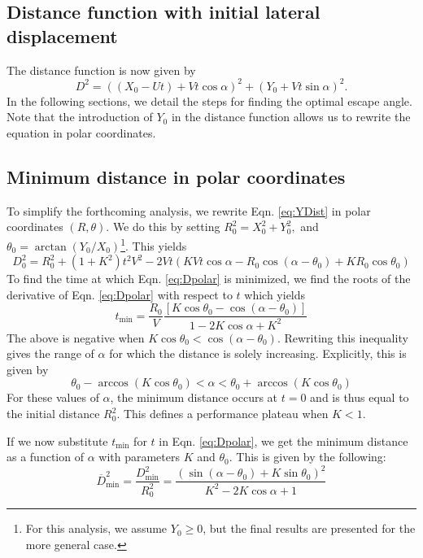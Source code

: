 \documentclass[12pt]{article}
\def\ds{\displaystyle}
\newcommand{\ol}{\overline}
\begin{document}
\subsection{Distance function with initial lateral displacement}
The distance function is now given by    
%
\begin{equation}
D^2 = ((X_0 - Ut) + Vt\cos\alpha)^2 + (Y_0 + Vt\sin\alpha)^2.
\label{eq:YDist}
\end{equation}
%
In the following sections, we detail the steps for finding the optimal escape angle. Note that the introduction of $Y_0$ in the distance function allows us to rewrite the equation in polar coordinates. 

\subsection{Minimum distance in polar coordinates}
To simplify the forthcoming analysis, we rewrite Eqn. \ref{eq:YDist} in polar coordinates $(R,\theta)$. We do this by setting $R_0^2 = X_0^2 + Y_0^2,$ and $\theta_0 = \arctan(Y_0/X_0)$\footnote{For this analysis, we assume $Y_0 \geq 0$, but the final results are presented for the more general case.}. This yields 
%
\begin{equation}
D_0^2 = R_0^2 + (1 + K^2) t^2 V^2 - 
 2 V t(K V t \cos \alpha  - R_0 \cos(\alpha - \theta_0) + K R_0 \cos \theta_0) 
 \label{eq:Dpolar}
\end{equation}
%
To find the time at which Eqn. \ref{eq:Dpolar} is minimized, we find the roots of the derivative of Eqn. \ref{eq:Dpolar} with respect to $t$ which yields
%
\begin{equation}
t_{\text{min}} = \ds \frac{R_0}{V} \frac{\left[K \cos \theta_0 - \cos(\alpha - \theta_0)\right ]}{1- 2K \cos \alpha + K^2}
\label{eq:tmin}
\end{equation}
%
The above is negative when $K \cos \theta_0 < \cos(\alpha - \theta_0).$ Rewriting this inequality gives the range of $\alpha$ for which the distance is solely increasing. Explicitly, this is given by  
%
\begin{equation}
\theta_0 - \arccos(K \cos \theta_0) < \alpha < \theta_0 + \arccos(K \cos \theta_0)
\label{eq:alphabound}
\end{equation}
%
For these values of $\alpha$, the minimum distance occurs at $t=0$ and is thus equal to the initial distance $R_0^2$. This defines a performance plateau when $K < 1.$

If we now substitute $t_{\text{min}}$ for $t$ in Eqn. \ref{eq:Dpolar}, we get the minimum distance as a function of $\alpha$ with parameters $K$ and $\theta_0$. This is given by the following: 
%
\begin{equation}
\ol{D}^2_{\text{min}}= \ds\frac{{D}^2_{\text{min}}}{R_0^2 }=
\ds\frac{\left ( \sin(\alpha - \theta_0) + K \sin \theta_0 \right )^2}{K^2-2 K \cos \alpha +1} 
\label{eq:Dmin_polar}
\end{equation}
%
\end{document}
